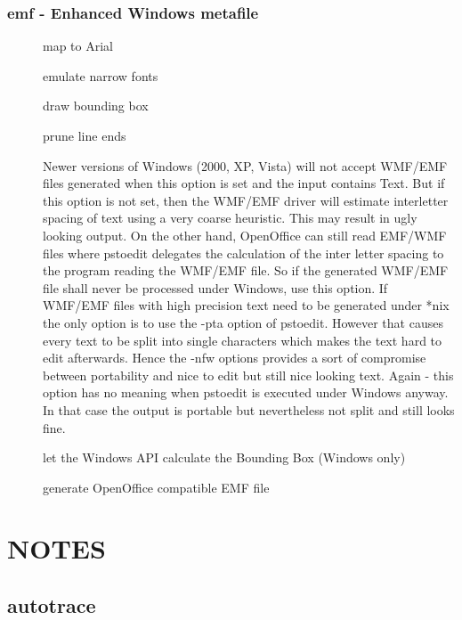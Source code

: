 \documentclass[english,a4paper]{article}
\begin{document}
\subsubsection{emf - Enhanced Windows metafile}
\begin{description}
\item[] 
map to Arial


\item[] 
emulate narrow fonts


\item[] 
draw bounding box


\item[] 
prune line ends


\item[] 
Newer versions of Windows (2000, XP, Vista) will not accept WMF/EMF files generated when this option is set and the input contains Text. But if this option is not set, then the WMF/EMF driver will estimate interletter spacing of text using a very coarse heuristic. This may result in ugly looking output. On the other hand, OpenOffice can still read EMF/WMF files where pstoedit delegates the calculation of the inter letter spacing to the program reading the WMF/EMF file. So if the generated WMF/EMF file shall never be processed under Windows, use this option. If WMF/EMF files with high precision text need to be generated under *nix the only option is to use the -pta option of pstoedit. However that causes every text to be split into single characters which makes the text hard to edit afterwards. Hence the -nfw options provides a sort of compromise between portability and nice to edit but still nice looking text. Again - this option has no meaning when pstoedit is executed under Windows anyway. In that case the output is portable but nevertheless not split and still looks fine.


\item[] 
let the Windows API calculate the Bounding Box (Windows only)


\item[] 
generate OpenOffice compatible EMF file


\end{description}

\section{NOTES}


  \subsection{autotrace}
\end{document}
